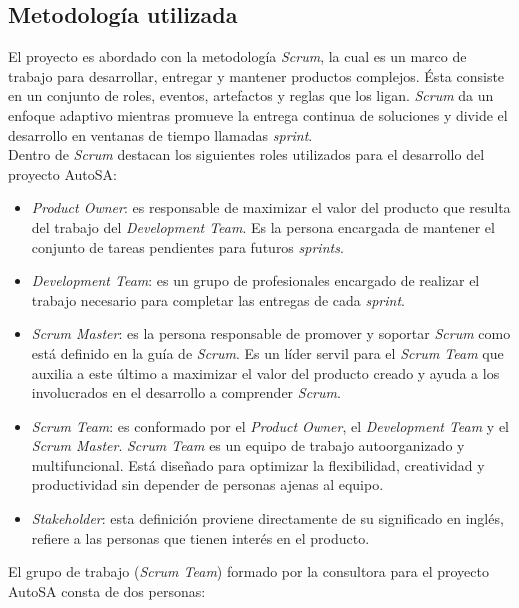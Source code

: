 \subsection{Metodología utilizada}
El proyecto es abordado con la metodología \textit{Scrum}, la cual es un marco de trabajo para desarrollar, entregar y mantener productos complejos. Ésta consiste en un conjunto de roles, eventos, artefactos y reglas que los ligan. \textit{Scrum} da un enfoque adaptivo mientras promueve la entrega continua de soluciones y divide el desarrollo en ventanas de tiempo llamadas \textit{sprint}\cite{scrum}.\\
Dentro de \textit{Scrum} destacan los siguientes roles utilizados para el desarrollo del proyecto AutoSA\cite{scrum}:
\begin{itemize}
	\item \textit{Product Owner}: es responsable de maximizar el valor del producto que resulta del trabajo del \textit{Development Team}. Es la persona encargada de mantener el conjunto de tareas pendientes para futuros \textit{sprints}.
	\item \textit{Development Team}: es un grupo de profesionales encargado de realizar el trabajo necesario para completar las entregas de cada \textit{sprint}.
	\item \textit{Scrum Master}: es la persona responsable de promover y soportar \textit{Scrum} como está definido en la guía de \textit{Scrum}. Es un líder servil para el \textit{Scrum Team} que auxilia a este último a maximizar el valor del producto creado y ayuda a los involucrados en el desarrollo a comprender \textit{Scrum}.
	\item \textit{Scrum Team}: es conformado por el \textit{Product Owner}, el \textit{Development Team} y el \textit{Scrum Master}. \textit{Scrum Team} es un equipo de trabajo autoorganizado y multifuncional. Está diseñado para optimizar la flexibilidad, creatividad y productividad sin depender de personas ajenas al equipo.
	\item \textit{Stakeholder}: esta definición proviene directamente de su significado en inglés, refiere a las personas que tienen interés en el producto.
\end{itemize}
El grupo de trabajo (\textit{Scrum Team}) formado por la consultora para el proyecto AutoSA consta de dos personas:
